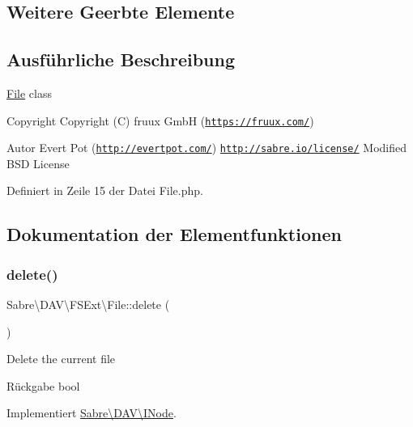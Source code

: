 \subsection*{Weitere Geerbte Elemente}


\subsection{Ausführliche Beschreibung}
\mbox{\hyperlink{class_sabre_1_1_d_a_v_1_1_f_s_ext_1_1_file}{File}} class

\begin{DoxyCopyright}{Copyright}
Copyright (C) fruux GmbH (\href{https://fruux.com/}{\tt https\+://fruux.\+com/}) 
\end{DoxyCopyright}
\begin{DoxyAuthor}{Autor}
Evert Pot (\href{http://evertpot.com/}{\tt http\+://evertpot.\+com/})  \href{http://sabre.io/license/}{\tt http\+://sabre.\+io/license/} Modified B\+SD License 
\end{DoxyAuthor}


Definiert in Zeile 15 der Datei File.\+php.



\subsection{Dokumentation der Elementfunktionen}
\mbox{\label{class_sabre_1_1_d_a_v_1_1_f_s_ext_1_1_file_a836db6b4a8216778cc4a19a2025eaf17}} 
\subsubsection{\texorpdfstring{delete()}{delete()}}
{\footnotesize\ttfamily Sabre\textbackslash{}\+D\+A\+V\textbackslash{}\+F\+S\+Ext\textbackslash{}\+File\+::delete (\begin{DoxyParamCaption}{ }\end{DoxyParamCaption})}

Delete the current file

\begin{DoxyReturn}{Rückgabe}
bool 
\end{DoxyReturn}


Implementiert \mbox{\hyperlink{interface_sabre_1_1_d_a_v_1_1_i_node_a72cd0ee4e36dfced2b0412d14dbd73e6}{Sabre\textbackslash{}\+D\+A\+V\textbackslash{}\+I\+Node}}.



